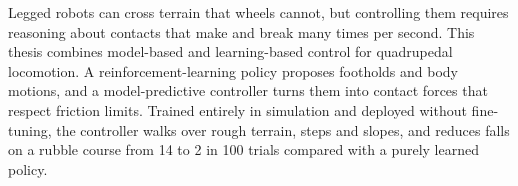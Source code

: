 Legged robots can cross terrain that wheels cannot, but controlling them requires reasoning about
contacts that make and break many times per second. This thesis combines model-based and
learning-based control for quadrupedal locomotion. A reinforcement-learning policy proposes
footholds and body motions, and a model-predictive controller turns them into contact forces
that respect friction limits. Trained entirely in simulation and deployed without fine-tuning,
the controller walks over rough terrain, steps and slopes, and reduces falls on a rubble course
from 14 to 2 in 100 trials compared with a purely learned policy.
